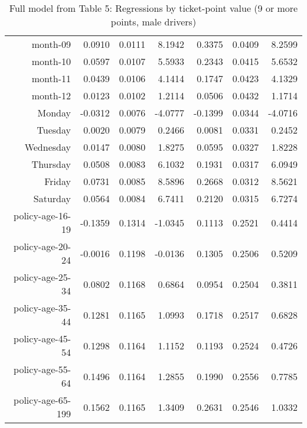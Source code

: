 \documentclass[10pt]{article}
\begin{document}
\begin{table}[ht]
\begin{tabular}{rrrrrrr}
  month-09 & 0.0910 & 0.0111 & 8.1942 & 0.3375 & 0.0409 & 8.2599 \\ 
  month-10 & 0.0597 & 0.0107 & 5.5933 & 0.2343 & 0.0415 & 5.6532 \\ 
  month-11 & 0.0439 & 0.0106 & 4.1414 & 0.1747 & 0.0423 & 4.1329 \\ 
  month-12 & 0.0123 & 0.0102 & 1.2114 & 0.0506 & 0.0432 & 1.1714 \\ 
  Monday & -0.0312 & 0.0076 & -4.0777 & -0.1399 & 0.0344 & -4.0716 \\ 
  Tuesday & 0.0020 & 0.0079 & 0.2466 & 0.0081 & 0.0331 & 0.2452 \\ 
  Wednesday & 0.0147 & 0.0080 & 1.8275 & 0.0595 & 0.0327 & 1.8228 \\ 
  Thursday & 0.0508 & 0.0083 & 6.1032 & 0.1931 & 0.0317 & 6.0949 \\ 
  Friday & 0.0731 & 0.0085 & 8.5896 & 0.2668 & 0.0312 & 8.5621 \\ 
  Saturday & 0.0564 & 0.0084 & 6.7411 & 0.2120 & 0.0315 & 6.7274 \\ 
  policy-age-16-19 & -0.1359 & 0.1314 & -1.0345 & 0.1113 & 0.2521 & 0.4414 \\ 
  policy-age-20-24 & -0.0016 & 0.1198 & -0.0136 & 0.1305 & 0.2506 & 0.5209 \\ 
  policy-age-25-34 & 0.0802 & 0.1168 & 0.6864 & 0.0954 & 0.2504 & 0.3811 \\ 
  policy-age-35-44 & 0.1281 & 0.1165 & 1.0993 & 0.1718 & 0.2517 & 0.6828 \\ 
  policy-age-45-54 & 0.1298 & 0.1164 & 1.1152 & 0.1193 & 0.2524 & 0.4726 \\ 
  policy-age-55-64 & 0.1496 & 0.1164 & 1.2855 & 0.1990 & 0.2556 & 0.7785 \\ 
  policy-age-65-199 & 0.1562 & 0.1165 & 1.3409 & 0.2631 & 0.2546 & 1.0332 \\ 
   \hline
\end{tabular}
\caption{Full model from Table 5: Regressions by ticket-point value (9 or more points, male drivers)} 
\label{tab_5_9plus_pts_M}
\end{table}


\clearpage
\pagebreak



\end{document}
